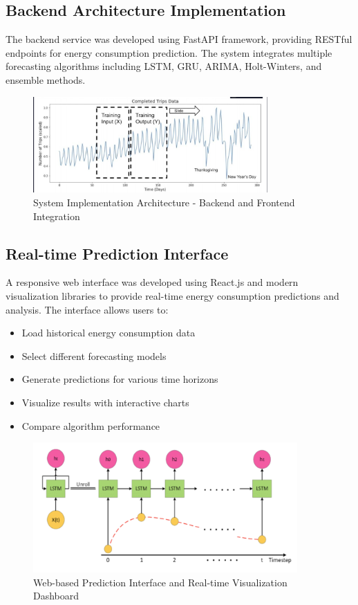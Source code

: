 \documentclass[12pt,a4paper]{report}
\begin{document}
\subsection{Backend Architecture Implementation}
The backend service was developed using FastAPI framework, providing RESTful endpoints for energy consumption prediction. The system integrates multiple forecasting algorithms including LSTM, GRU, ARIMA, Holt-Winters, and ensemble methods.

\begin{figure}[H]
    \centering
    \includegraphics[width=0.8\textwidth]{1.png}
    \caption{System Implementation Architecture - Backend and Frontend Integration}
    \label{fig:system_implementation}
\end{figure}

\subsection{Real-time Prediction Interface}
A responsive web interface was developed using React.js and modern visualization libraries to provide real-time energy consumption predictions and analysis. The interface allows users to:
\begin{itemize}
\item Load historical energy consumption data
\item Select different forecasting models
\item Generate predictions for various time horizons
\item Visualize results with interactive charts
\item Compare algorithm performance
\end{itemize}

\begin{figure}[H]
    \centering
    \includegraphics[width=0.9\textwidth]{2.png}
    \caption{Web-based Prediction Interface and Real-time Visualization Dashboard}
    \label{fig:web_interface}
\end{figure}
\end{document}
